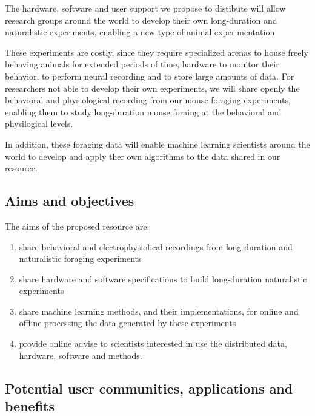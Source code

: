 The hardware, software and user support we propose to distibute will allow
research groups around the world to develop their own long-duration and
naturalistic experiments, enabling a new type of animal experimentation.

These experiments are costly, since they require specialized arenas to house
freely behaving animals for extended periods of time, hardware to monitor their
behavior, to perform neural recording and to store large amounts of data. For
researchers not able to develop their own experiments, we will share openly the
behavioral and physiological recording from our mouse foraging experiments,
enabling them to study long-duration mouse foraing at the behavioral and
physilogical levels.

In addition, these foraging data will enable machine learning scientists around
the world to develop and apply ther own algorithms to the data shared in our
resource.

\subsection{Aims and objectives}

The aims of the proposed resource are:

\begin{enumerate}

    \item share behavioral and electrophysiolical recordings from long-duration
        and naturalistic foraging experiments

    \item share hardware and software specifications to build long-duration
        naturalistic experiments

    \item share machine learning methods, and their implementations, for online
        and offline processing the data generated by these experiments

    \item provide online advise to scientists interested in use the distributed
        data, hardware, software and methods.

\end{enumerate}

\subsection{Potential user communities, applications and benefits}


